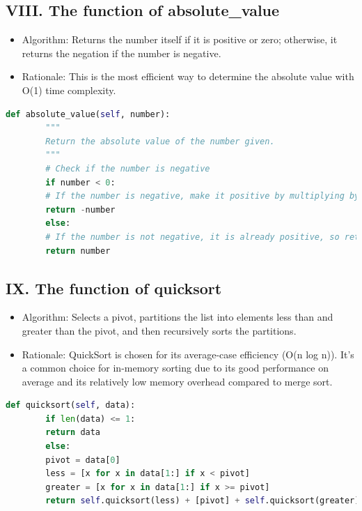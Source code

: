 \documentclass[english,12pt,a4paper]{report}
\begin{document}
	
	\subsection*{VIII. The function of absolute\_value}
	\begin{itemize}[leftmargin=*]
		\item Algorithm: Returns the number itself if it is positive or zero; otherwise, it returns the negation if the number is negative.
		\item Rationale: This is the most efficient way to determine the absolute value with O(1) time complexity.
	\end{itemize}
	\begin{lstlisting}[language=Python, caption=Absolute Value Method]
		def absolute_value(self, number):
		"""
		Return the absolute value of the number given.
		"""
		# Check if the number is negative
		if number < 0:
		# If the number is negative, make it positive by multiplying by -1
		return -number
		else:
		# If the number is not negative, it is already positive, so return as is
		return number
	\end{lstlisting}
	
	
	\subsection*{IX. The function of quicksort}
	\begin{itemize}[leftmargin=*]
		\item Algorithm: Selects a pivot, partitions the list into elements less than and greater than the pivot, and then recursively sorts the partitions.
		\item Rationale: QuickSort is chosen for its average-case efficiency (O(n log n)). It's a common choice for in-memory sorting due to its good performance on average and its relatively low memory overhead compared to merge sort.
	\end{itemize}
	\begin{lstlisting}[language=Python, caption=QuickSort Method]
		def quicksort(self, data):
		if len(data) <= 1:
		return data
		else:
		pivot = data[0]
		less = [x for x in data[1:] if x < pivot]
		greater = [x for x in data[1:] if x >= pivot]
		return self.quicksort(less) + [pivot] + self.quicksort(greater)
	\end{lstlisting}
	
	
\end{document}
